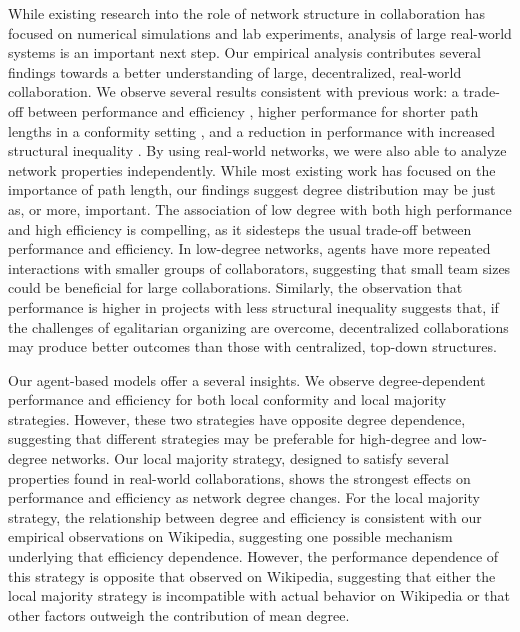 While existing research into the role of network structure in collaboration
has focused on numerical simulations and lab experiments,
analysis of large real-world systems is an important next step.
Our empirical analysis contributes several findings towards a better
understanding of large, decentralized, real-world collaboration.
We observe several results consistent with previous work:
a trade-off between performance and efficiency
\cite{mason_propagation_2008,grim_scientific_2013},
higher performance for shorter path lengths in a conformity setting
\cite{barkoczi_social_2016},
and a reduction in performance with increased structural inequality
\cite{kearns_experiments_2012}.
By using real-world networks, we were also able to analyze network properties independently.
While most existing work has focused on the importance of path length,
our findings suggest degree distribution may be just as, or more, important.
The association of low degree with both high performance and high efficiency is compelling,
as it sidesteps the usual trade-off between performance and efficiency.
In low-degree networks, agents have more repeated interactions with smaller groups of collaborators, suggesting that small team sizes could be beneficial for large collaborations.
Similarly, the observation that performance is higher in projects with less structural inequality suggests that,
if the challenges of egalitarian organizing are overcome,
decentralized collaborations may produce better outcomes than those with centralized, top-down structures.

Our agent-based models offer a several insights.
We observe degree-dependent performance and efficiency
for both local conformity and local majority strategies.
However, these two strategies have opposite degree dependence,
suggesting that different strategies may be preferable for high-degree and low-degree
networks.
Our local majority strategy,
designed to satisfy several properties found in real-world collaborations,
shows the strongest effects on performance and efficiency as network degree changes.
For the local majority strategy,
the relationship between degree and efficiency is consistent with our
empirical observations on Wikipedia,
suggesting one possible mechanism underlying that efficiency dependence.
However, the performance dependence of this strategy
is opposite that observed on Wikipedia,
suggesting that either the local majority strategy
is incompatible with actual behavior on Wikipedia or
that other factors outweigh the contribution of mean degree.


